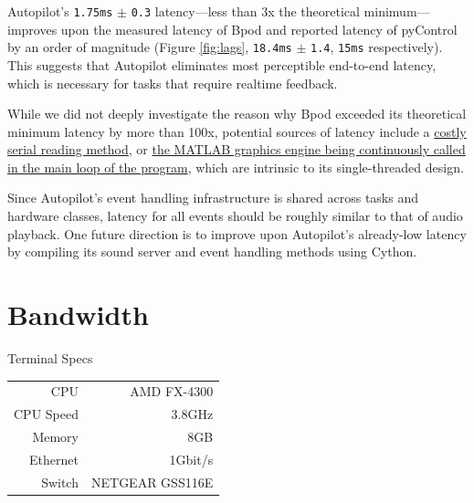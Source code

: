\documentclass[nohyper, justified, notitlepage, marginals=raggedright,twoside=false,debug]{tufte-autopilot}
\begin{document}
\clearpage

Autopilot's  \texttt{1.75ms} $\pm$ \texttt{0.3} latency---less than 3x the theoretical minimum---improves upon the measured latency of Bpod and reported latency of pyControl by an order of magnitude (Figure \ref{fig:lags}, \texttt{18.4ms} $\pm$ \texttt{1.4}, \texttt{15ms} respectively). This suggests that Autopilot eliminates most perceptible end-to-end latency, which is necessary for tasks that require realtime feedback.

While we did not deeply investigate the reason why Bpod exceeded its theoretical minimum latency by more than 100x, potential sources of latency include a \href{https://github.com/sanworks/Bpod_Gen2/blob/825eaf6ea2cb11da956ee21c42876c4363e9c14e/Functions/Internal\%20Functions/ArCOM/ArCOMObject_Bpod.m#L304}{costly serial reading method}, or \href{https://github.com/sanworks/Bpod/blob/4b756d8251f0a06ee9a442e9cac465872c1b4174/Functions/RunStateMatrix.m#L189}{the MATLAB graphics engine being continuously called in the main loop of the program}, which are intrinsic to its single-threaded design.

Since Autopilot's event handling infrastructure is shared across tasks and hardware classes, latency for all events should be roughly similar to that of audio playback. One future direction is to improve upon Autopilot's already-low latency by compiling its sound server and event handling methods using Cython.

\section{Bandwidth}

\begin{margintable}[-6.6cm]
\caption{Terminal Specs}
\label{tab:terminal}
\noindent\begin{tabularx}{\linewidth}{rR}
\toprule
    CPU & AMD FX-4300 \\
    CPU Speed & 3.8GHz \\
    Memory & 8GB \\
    Ethernet & 1Gbit/s \\
    Switch & NETGEAR GSS116E \\
\bottomrule
\end{tabularx}
\end{margintable}
\end{document}
